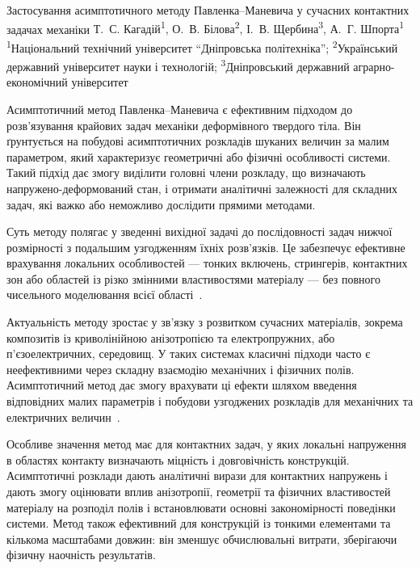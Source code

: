 \ReportHeading
  {Застосування асимптотичного методу Павленка--Маневича у сучасних контактних задачах механіки}
  {Т.~С. Кагадій\textsuperscript{1}, О.~В. Білова\textsuperscript{2}, І.~В. Щербина\textsuperscript{3}, А.~Г. Шпорта\textsuperscript{1}}
  {\textsuperscript{1}Національний технічний університет ``Дніпровська політехніка''; \textsuperscript{2}Український державний університет науки і технологій; \textsuperscript{3}Дніпровський державний аграрно-економічний університет}
  {}

Асимптотичний метод Павленка--Маневича є ефективним підходом до розв’язування крайових задач механіки деформівного твердого тіла. Він ґрунтується на побудові асимптотичних розкладів шуканих величин за малим параметром, який характеризує геометричні або фізичні особливості системи. Такий підхід дає змогу виділити головні члени розкладу, що визначають напружено-деформований стан, і отримати аналітичні залежності для складних задач, які важко або неможливо дослідити прямими методами.

Суть методу полягає у зведенні вихідної задачі до послідовності задач нижчої розмірності з подальшим узгодженням їхніх розв’язків. Це забезпечує ефективне врахування локальних особливостей --- тонких включень, стрингерів, контактних зон або областей із різко змінними властивостями матеріалу --- без повного чисельного моделювання всієї області~\cite{pavlenko:kagadiy2016}.

Актуальність методу зростає у зв’язку з розвитком сучасних матеріалів, зокрема композитів із криволінійною анізотропією та електропружних, або п’єзоелектричних, середовищ. У таких системах класичні підходи часто є неефективними через складну взаємодію механічних і фізичних полів. Асимптотичний метод дає змогу врахувати ці ефекти шляхом введення відповідних малих параметрів і побудови узгоджених розкладів для механічних та електричних величин~\cite{pavlenko:kagadiy2016,pavlenko:kagadiy2021}.

Особливе значення метод має для контактних задач, у яких локальні напруження в областях контакту визначають міцність і довговічність конструкцій. Асимптотичні розклади дають аналітичні вирази для контактних напружень і дають змогу оцінювати вплив анізотропії, геометрії та фізичних властивостей матеріалу на розподіл полів і встановлювати основні закономірності поведінки системи. Метод також ефективний для конструкцій із тонкими елементами та кількома масштабами довжин: він зменшує обчислювальні витрати, зберігаючи фізичну наочність результатів.

